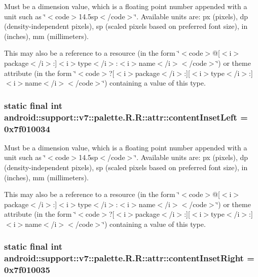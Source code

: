 Must be a dimension value, which is a floating point number appended with a unit such as \char`\"{}$<$code$>$14.5sp$<$/code$>$\char`\"{}. Available units are: px (pixels), dp (density-independent pixels), sp (scaled pixels based on preferred font size), in (inches), mm (millimeters). 

This may also be a reference to a resource (in the form \char`\"{}$<$code$>$@\mbox{[}$<$i$>$package$<$/i$>$:\mbox{]}$<$i$>$type$<$/i$>$:$<$i$>$name$<$/i$>$$<$/code$>$\char`\"{}) or theme attribute (in the form \char`\"{}$<$code$>$?\mbox{[}$<$i$>$package$<$/i$>$:\mbox{]}\mbox{[}$<$i$>$type$<$/i$>$:\mbox{]}$<$i$>$name$<$/i$>$$<$/code$>$\char`\"{}) containing a value of this type. \hypertarget{classandroid_1_1support_1_1v7_1_1palette_1_1_r_1_1attr_4a66e002af4ff2559f80860dc6bf6e04}{
\subsubsection[{contentInsetLeft}]{\setlength{\rightskip}{0pt plus 5cm}static final int android::support::v7::palette.R.R::attr::contentInsetLeft = 0x7f010034}}
\label{classandroid_1_1support_1_1v7_1_1palette_1_1_r_1_1attr_4a66e002af4ff2559f80860dc6bf6e04}


Must be a dimension value, which is a floating point number appended with a unit such as \char`\"{}$<$code$>$14.5sp$<$/code$>$\char`\"{}. Available units are: px (pixels), dp (density-independent pixels), sp (scaled pixels based on preferred font size), in (inches), mm (millimeters). 

This may also be a reference to a resource (in the form \char`\"{}$<$code$>$@\mbox{[}$<$i$>$package$<$/i$>$:\mbox{]}$<$i$>$type$<$/i$>$:$<$i$>$name$<$/i$>$$<$/code$>$\char`\"{}) or theme attribute (in the form \char`\"{}$<$code$>$?\mbox{[}$<$i$>$package$<$/i$>$:\mbox{]}\mbox{[}$<$i$>$type$<$/i$>$:\mbox{]}$<$i$>$name$<$/i$>$$<$/code$>$\char`\"{}) containing a value of this type. \hypertarget{classandroid_1_1support_1_1v7_1_1palette_1_1_r_1_1attr_01c7099e6d43b85a87c4fdbb4b0e6cc6}{
\subsubsection[{contentInsetRight}]{\setlength{\rightskip}{0pt plus 5cm}static final int android::support::v7::palette.R.R::attr::contentInsetRight = 0x7f010035}}
\label{classandroid_1_1support_1_1v7_1_1palette_1_1_r_1_1attr_01c7099e6d43b85a87c4fdbb4b0e6cc6}


